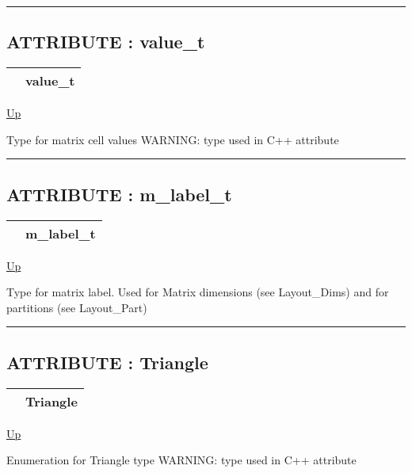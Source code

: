 \rule{\textwidth}{0.4pt}
\subsection*{ATTRIBUTE : value\_t}
\hypertarget{ecldoc:pbblas.types.value_t}{}

{\renewcommand{\arraystretch}{1.5}
\begin{tabularx}{\textwidth}{|>{\raggedright\arraybackslash}l|X|}
\hline
\hspace{0pt} & value\_t \\
\hline
\end{tabularx}
}

\hyperlink{ecldoc:PBblas.Types}{Up}

\par
Type for matrix cell values WARNING: type used in C++ attribute


\rule{\textwidth}{0.4pt}
\subsection*{ATTRIBUTE : m\_label\_t}
\hypertarget{ecldoc:pbblas.types.m_label_t}{}

{\renewcommand{\arraystretch}{1.5}
\begin{tabularx}{\textwidth}{|>{\raggedright\arraybackslash}l|X|}
\hline
\hspace{0pt} & m\_label\_t \\
\hline
\end{tabularx}
}

\hyperlink{ecldoc:PBblas.Types}{Up}

\par
Type for matrix label. Used for Matrix dimensions (see Layout\_Dims) and for partitions (see Layout\_Part)


\rule{\textwidth}{0.4pt}
\subsection*{ATTRIBUTE : Triangle}
\hypertarget{ecldoc:ecldoc-Triangle}{}

{\renewcommand{\arraystretch}{1.5}
\begin{tabularx}{\textwidth}{|>{\raggedright\arraybackslash}l|X|}
\hline
\hspace{0pt} & Triangle \\
\hline
\end{tabularx}
}

\hyperlink{ecldoc:PBblas.Types}{Up}

\par
Enumeration for Triangle type WARNING: type used in C++ attribute


